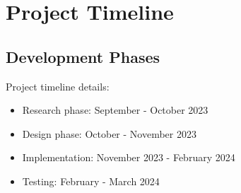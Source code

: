 \section{Project Timeline}
\subsection{Development Phases}
Project timeline details:
\begin{itemize}
    \item Research phase: September - October 2023
    \item Design phase: October - November 2023
    \item Implementation: November 2023 - February 2024
    \item Testing: February - March 2024
\end{itemize}
